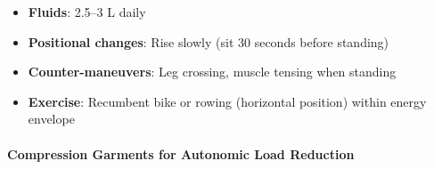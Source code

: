 \begin{itemize}
    This formulation provides sodium, potassium, chloride, and glucose in ratios optimized for absorption and metabolic support. See Appendix~\ref{subsubsubsec:sports-medicine-parallel} for the clinical insight that led to this protocol development.

    \item \textbf{Fluids}: 2.5--3 L daily
    \item \textbf{Positional changes}: Rise slowly (sit 30 seconds before standing)
    \item \textbf{Counter-maneuvers}: Leg crossing, muscle tensing when standing
    \item \textbf{Exercise}: Recumbent bike or rowing (horizontal position) within energy envelope
\end{itemize}

\paragraph{Compression Garments for Autonomic Load Reduction}

